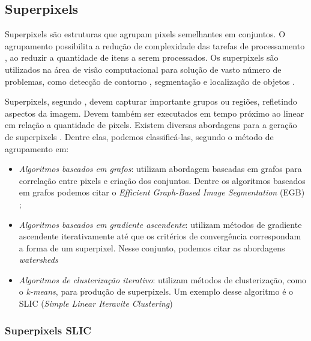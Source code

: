 \begin{document}

\subsection{Superpixels} \label{ssec:super}

Superpixels são estruturas que agrupam pixels semelhantes em conjuntos. O agrupamento possibilita a redução de complexidade das tarefas de processamento \cite{SLIC}, ao reduzir a quantidade de itens a serem processados. Os superpixels são utilizados na área de visão computacional para solução de vasto número de problemas, como detecção de contorno \cite{CONTOUR}, segmentação \cite{SEG_MERGE} e localização de objetos \cite{SEG_LOCALIZ}.

Superpixels, segundo \cite{FELZENSZWALB}, devem capturar importante grupos ou regiões, refletindo aspectos da imagem. Devem também ser executados em tempo próximo ao linear em relação a quantidade de pixels. Existem diversas abordagens para a geração de superpixels \cite{SLIC}. Dentre elas, podemos classificá-las, segundo o método de agrupamento em: 

\begin{itemize}
 \item \textit{Algoritmos baseados em grafos}: utilizam abordagem baseadas em grafos para correlação entre pixels e criação dos conjuntos. Dentre os algoritmos baseados em grafos podemos citar o \textit{Efficient Graph-Based Image Segmentation} (EGB) \cite{FELZENSZWALB};
 \item \textit{Algoritmos baseados em gradiente ascendente}: utilizam métodos de gradiente ascendente iterativamente até que os critérios de convergência correspondam a forma de um superpixel. Nesse conjunto, podemos  citar as abordagens \textit{watersheds} \cite{WATERSHEDS} \cite{SLIC}
 \item \textit{Algoritmos de clusterização iterativo}: utilizam métodos de clusterização, como o \textit{k-means}, para produção de superpixels. Um exemplo desse algoritmo é o SLIC (\textit{Simple Linear Iteravite Clustering}) \cite{SLIC}
\end{itemize}


\subsubsection{Superpixels SLIC} \label{sssec:slic}
\end{document}
